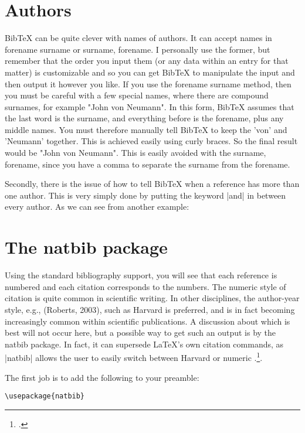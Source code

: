 \begin{refsection}
\section{Authors}

BibTeX can be quite clever with names of authors. It can accept names in forename surname or surname, forename. I personally use the former, but remember that the order you input them (or any data within an entry for that matter) is customizable and so you can get BibTeX to manipulate the input and then output it however you like. If you use the forename surname method, then you must be careful with a few special names, where there are compound surnames, for example "John von Neumann". In this form, BibTeX assumes that the last word is the surname, and everything before is the forename, plus any middle names. You must therefore manually tell BibTeX to keep the 'von' and 'Neumann' together. This is achieved easily using curly braces. So the final result would be "John {von Neumann}". This is easily avoided with the surname, forename, since you have a comma to separate the surname from the forename.

Secondly, there is the issue of how to tell BibTeX when a reference has more than one author. This is very simply done by putting the keyword |and| in between every author. As we can see from another example:


\section{The natbib package}

Using the standard \latex bibliography support, you will see that each reference is numbered and each citation corresponds to the numbers. The numeric style of citation is quite common in scientific writing. In other disciplines, the author-year style, e.g., (Roberts, 2003), such as Harvard is preferred, and is in fact becoming increasingly common within scientific publications. A discussion about which is best will not occur here, but a possible way to get such an output is by the natbib package. In fact, it can supersede LaTeX's own citation commands, as |natbib| allows the user to easily switch between Harvard or numeric .\footcite{natbib}.


The first job is to add the following to your preamble:

\begin{verbatim}
\usepackage{natbib}
\end{verbatim}



\end{refsection}
